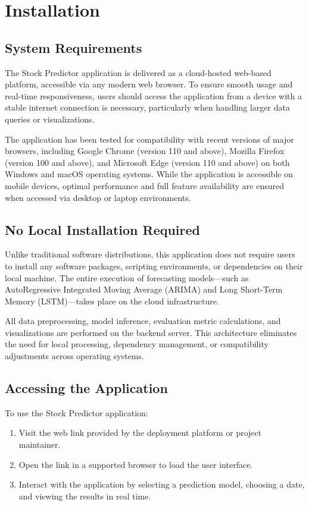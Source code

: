 %
%

\chapter{Installation}

\section{System Requirements}
The Stock Predictor application is delivered as a cloud-hosted web-based platform, accessible via any modern web browser. To ensure smooth usage and real-time responsiveness, users should access the application from a device with a stable internet connection is necessary, particularly when handling larger data queries or visualizations.

The application has been tested for compatibility with recent versions of major browsers, including Google Chrome (version 110 and above), Mozilla Firefox (version 100 and above), and Microsoft Edge (version 110 and above) on both Windows and macOS operating systems. While the application is accessible on mobile devices, optimal performance and full feature availability are ensured when accessed via desktop or laptop environments.

\section{No Local Installation Required}
Unlike traditional software distributions, this application does not require users to install any software packages, scripting environments, or dependencies on their local machine. The entire execution of forecasting models—such as AutoRegressive Integrated Moving Average (ARIMA) and Long Short-Term Memory (LSTM)—takes place on the cloud infrastructure.

All data preprocessing, model inference, evaluation metric calculations, and visualizations are performed on the backend server. This architecture eliminates the need for local processing, dependency management, or compatibility adjustments across operating systems.

\section{Accessing the Application}
To use the Stock Predictor application:
\begin{enumerate}
	\item Visit the web link provided by the deployment platform or project maintainer.
	\item Open the link in a supported browser to load the user interface.
	\item Interact with the application by selecting a prediction model, choosing a date, and viewing the results in real time.
\end{enumerate}

